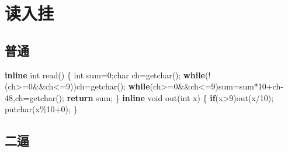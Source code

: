 \documentclass[
]{article}
\newenvironment{Shaded}{}{}
\newcommand{\CharTok}[1]{\textcolor[rgb]{0.25,0.44,0.63}{#1}}
\newcommand{\ControlFlowTok}[1]{\textcolor[rgb]{0.00,0.44,0.13}{\textbf{#1}}}
\newcommand{\DataTypeTok}[1]{\textcolor[rgb]{0.56,0.13,0.00}{#1}}
\newcommand{\DecValTok}[1]{\textcolor[rgb]{0.25,0.63,0.44}{#1}}
\newcommand{\KeywordTok}[1]{\textcolor[rgb]{0.00,0.44,0.13}{\textbf{#1}}}
\newcommand{\NormalTok}[1]{#1}
\begin{document}
\hypertarget{ux8bfbux5165ux6302}{%
\section{读入挂}\label{ux8bfbux5165ux6302}}

\hypertarget{ux666eux901a}{%
\subsection{普通}\label{ux666eux901a}}

\begin{Shaded}
\begin{Highlighting}[]
\KeywordTok{inline} \DataTypeTok{int}\NormalTok{ read()}
\NormalTok{\{}
    \DataTypeTok{int}\NormalTok{ sum=}\DecValTok{0}\NormalTok{;}\DataTypeTok{char}\NormalTok{ ch=getchar();}
    \ControlFlowTok{while}\NormalTok{(!(ch\textgreater{}=}\CharTok{\textquotesingle{}0\textquotesingle{}}\NormalTok{\&\&ch\textless{}=}\CharTok{\textquotesingle{}9\textquotesingle{}}\NormalTok{))ch=getchar();}
    \ControlFlowTok{while}\NormalTok{(ch\textgreater{}=}\CharTok{\textquotesingle{}0\textquotesingle{}}\NormalTok{\&\&ch\textless{}=}\CharTok{\textquotesingle{}9\textquotesingle{}}\NormalTok{)sum=sum*}\DecValTok{10}\NormalTok{+ch{-}}\DecValTok{48}\NormalTok{,ch=getchar();}
    \ControlFlowTok{return}\NormalTok{ sum;}
\NormalTok{\}}
\KeywordTok{inline} \DataTypeTok{void}\NormalTok{ out(}\DataTypeTok{int}\NormalTok{ x)}
\NormalTok{\{}
   \ControlFlowTok{if}\NormalTok{(x\textgreater{}}\DecValTok{9}\NormalTok{)out(x/}\DecValTok{10}\NormalTok{);}
\NormalTok{   putchar(x\%}\DecValTok{10}\NormalTok{+}\CharTok{\textquotesingle{}0\textquotesingle{}}\NormalTok{);}
\NormalTok{\}}
\end{Highlighting}
\end{Shaded}

\hypertarget{ux4e8cux903c}{%
\subsection{二逼}\label{ux4e8cux903c}}
\end{document}

